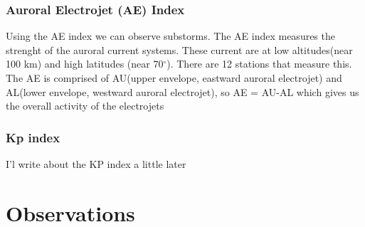 \documentclass[norsk,a4paper,11pt]{article}
\begin{document}
\begin{multicols}{2}
\subsubsection{Auroral Electrojet (AE) Index} %
\label{sub:AE_index}
Using the AE index we can observe substorms. The AE index measures the strenght of the auroral current systems. These current are at low altitudes(near 100 km) and high latitudes (near 70$^\circ$). There are 12 stations that measure this. The AE is comprised of AU(upper envelope, eastward auroral electrojet) and AL(lower envelope, westward auroral electrojet), so AE = AU-AL which gives us the overall activity of the electrojets

\subsubsection{Kp index} %
\label{sub:Kp_index}
I'l write about the KP index a little later






\section{Observations} %
\label{sec:observations}


\end{multicols}
\end{document}
